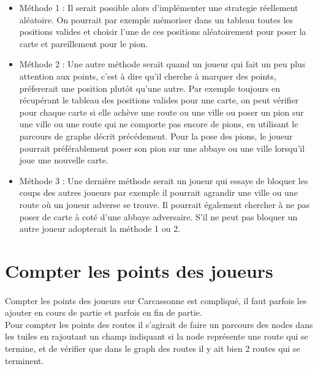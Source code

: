 \documentclass[12pt]{article}
\begin{document}
\begin{itemize}

\item Méthode 1 : Il serait possible alors d'implémenter une strategie réellement aléatoire. On pourrait par exemple mémoriser dans un tableau toutes les positions valides et choisir l'une de ces positions aléatoirement pour poser la carte et pareillement pour le pion.\\

\item Méthode 2 : Une autre méthode serait quand un joueur qui fait un peu plus attention aux points, c'est à dire qu'il cherche à marquer des points, préfererait une position plutôt qu'une autre. Par exemple toujours en récupérant le tableau des positions valides pour une carte, on peut vérifier pour chaque carte si elle achève une route ou une ville ou poser un pion sur une ville ou une route qui ne comporte pas encore de pions, en utilisant le parcours de graphe décrit précédement. Pour la pose des pions, le joueur pourrait préférablement poser son pion sur une abbaye ou une ville lorsqu'il joue une nouvelle carte.\\

\item Méthode 3 : Une dernière méthode serait un joueur qui essaye de bloquer les coups des autres joueurs par exemple il pourrait agrandir une ville ou une route où un joueur adverse se trouve. Il pourrait également chercher à ne pas poser de carte à coté d'une abbaye adversaire. S'il ne peut pas bloquer un autre joueur adopterait la méthode 1 ou 2.\\

\end{itemize}

\section{Compter les points des joueurs}

\paragraph{} Compter les points des joueurs sur Carcassonne est compliqué, il faut parfois les ajouter en cours de partie et parfois en fin de partie.\\

Pour compter les points des routes il s'agirait de faire un parcours des nodes dans les tuiles en rajoutant un champ indiquant si la node représente une route qui se termine, et de vérifier que dans le graph des routes il y ait bien 2 routes qui se terminent.\\
\end{document}
